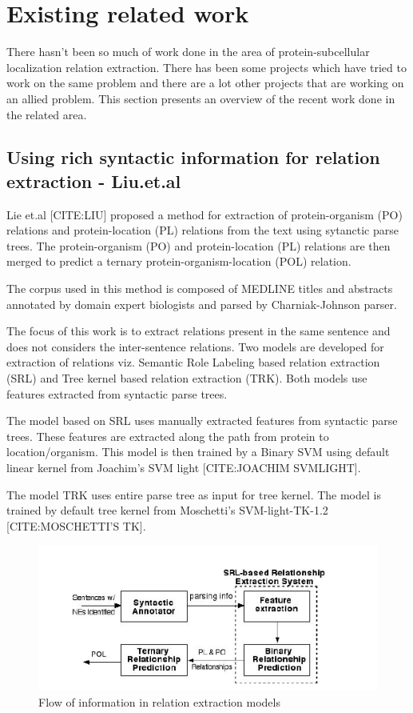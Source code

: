 \section{Existing related work}\label{sec:existingWork}

There hasn't been so much of work done in the area of protein-subcellular localization relation extraction. There has been some projects which have tried to work on the same problem and there are a lot other projects that are working on an allied problem. This section presents an overview of the recent work done in the related area.


\subsection*{Using rich syntactic information for relation extraction - Liu.et.al}

Lie et.al [CITE:LIU] proposed a method for extraction of protein-organism (PO) relations and protein-location (PL) relations from the text using sytanctic parse trees. The protein-organism (PO) and protein-location (PL) relations are then merged to predict a ternary protein-organism-location (POL) relation.

The corpus used in this method is composed of MEDLINE titles and abstracts annotated by domain expert biologists and parsed by Charniak-Johnson parser.

The focus of this work is to extract relations present in the same sentence and does not considers the inter-sentence relations. Two models are developed for extraction of relations viz. Semantic Role Labeling based relation extraction (SRL) and Tree kernel based relation extraction (TRK). Both models use features extracted from syntactic parse trees.

The model based on SRL uses manually extracted features from syntactic parse trees. These features are extracted along the path from protein to location/organism. This model is then trained by a Binary SVM using default linear kernel from Joachim’s SVM light [CITE:JOACHIM SVMLIGHT].

The model TRK uses entire parse tree as input for tree kernel. The model is trained by default tree kernel from Moschetti’s SVM-light-TK-1.2 [CITE:MOSCHETTI'S TK].

\begin{figure}[hbtp]
\includegraphics[scale=1]{figures/Liu_Flow.png}
\caption{Flow of information in relation extraction models }\label{fig:Liu}
\end{figure}



